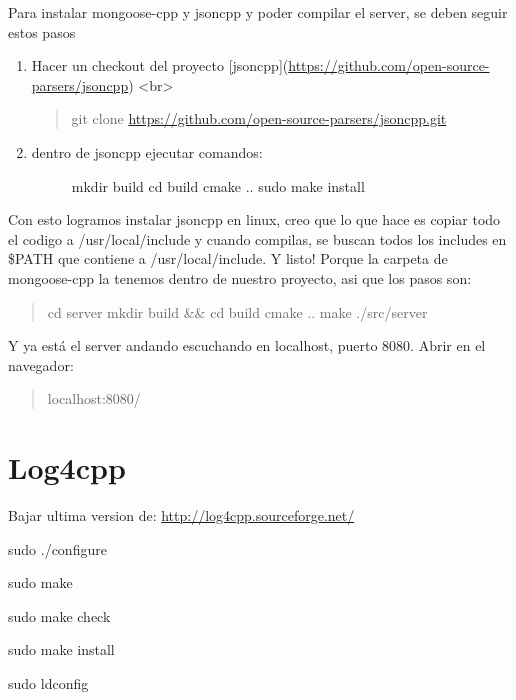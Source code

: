 \documentclass[letterpaper,10pt,spanish]{sphinxmanual}
\begin{document}
Para instalar mongoose-cpp y jsoncpp y poder compilar el server, se deben seguir estos pasos
\begin{enumerate}
\item {} 
Hacer un checkout del proyecto {[}jsoncpp{]}(\url{https://github.com/open-source-parsers/jsoncpp}) \textless{}br\textgreater{}
\begin{quote}

git clone \url{https://github.com/open-source-parsers/jsoncpp.git}
\end{quote}

\item {} \begin{description}
\item[{dentro de jsoncpp ejecutar comandos:}] \leavevmode
mkdir build
cd build
cmake ..
sudo make install

\end{description}

\end{enumerate}

Con esto logramos instalar jsoncpp en linux, creo que lo que hace es copiar todo el codigo a /usr/local/include y cuando compilas, se buscan todos los includes en \$PATH que contiene a /usr/local/include.
Y listo! Porque la carpeta de mongoose-cpp la tenemos dentro de nuestro proyecto, asi que los pasos son:
\begin{quote}

cd server
mkdir build \&\& cd build
cmake ..
make
./src/server
\end{quote}

Y ya está el server andando escuchando en localhost, puerto 8080. Abrir en el navegador:
\begin{quote}

localhost:8080/
\end{quote}


\section{Log4cpp}
\label{Log4cpp::doc}\label{Log4cpp:log4cpp}
Bajar ultima version de: \url{http://log4cpp.sourceforge.net/}

sudo ./configure

sudo make

sudo make check

sudo make install

sudo ldconfig



\renewcommand{\indexname}{Índice}
\printindex
\end{document}
